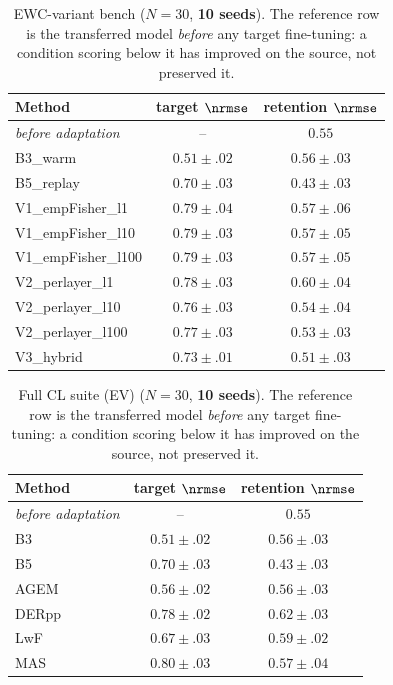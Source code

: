 \begin{table}[t]
\centering
\caption{EWC-variant bench ($N{=}30$, \textbf{10 seeds}). The reference row is the transferred model \emph{before} any target fine-tuning: a condition scoring below it has improved on the source, not preserved it.}
\label{tab:bench}
\begin{tabular}{lcc}
\toprule
Method & target $\nrmse$ & retention $\nrmse$\\
\midrule
\emph{before adaptation} & -- & $\mathit{0.55}$\\
\midrule
B3\_warm & $0.51\pm.02$ & $0.56\pm.03$\\
B5\_replay & $0.70\pm.03$ & $0.43\pm.03$\\
V1\_empFisher\_l1 & $0.79\pm.04$ & $0.57\pm.06$\\
V1\_empFisher\_l10 & $0.79\pm.03$ & $0.57\pm.05$\\
V1\_empFisher\_l100 & $0.79\pm.03$ & $0.57\pm.05$\\
V2\_perlayer\_l1 & $0.78\pm.03$ & $0.60\pm.04$\\
V2\_perlayer\_l10 & $0.76\pm.03$ & $0.54\pm.04$\\
V2\_perlayer\_l100 & $0.77\pm.03$ & $0.53\pm.03$\\
V3\_hybrid & $0.73\pm.01$ & $0.51\pm.03$\\
\bottomrule
\end{tabular}
\end{table}

\begin{table}[t]
\centering
\caption{Full CL suite (EV) ($N{=}30$, \textbf{10 seeds}). The reference row is the transferred model \emph{before} any target fine-tuning: a condition scoring below it has improved on the source, not preserved it.}
\label{tab:clsuite}
\begin{tabular}{lcc}
\toprule
Method & target $\nrmse$ & retention $\nrmse$\\
\midrule
\emph{before adaptation} & -- & $\mathit{0.55}$\\
\midrule
B3 & $0.51\pm.02$ & $0.56\pm.03$\\
B5 & $0.70\pm.03$ & $0.43\pm.03$\\
AGEM & $0.56\pm.02$ & $0.56\pm.03$\\
DERpp & $0.78\pm.02$ & $0.62\pm.03$\\
LwF & $0.67\pm.03$ & $0.59\pm.02$\\
MAS & $0.80\pm.03$ & $0.57\pm.04$\\
\bottomrule
\end{tabular}
\end{table}

